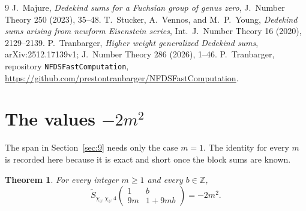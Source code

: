 \documentclass[11pt]{article}
\newtheorem{theorem}{Theorem}
\theoremstyle{remark}
\newcommand{\tS}{\widetilde{S}}
\newcommand{\Z}{\mathbb{Z}}
\begin{document}
\begin{thebibliography}{9}
J.~Majure, \emph{Dedekind sums for a Fuchsian group of genus zero}, J.~Number Theory 250 (2023), 35--48.
T.~Stucker, A.~Vennos, and M.~P.~Young, \emph{Dedekind sums arising from newform Eisenstein series}, Int.~J.~Number Theory 16 (2020), 2129--2139.
P.~Tranbarger, \emph{Higher weight generalized Dedekind sums}, arXiv:2512.17139v1; J.~Number Theory 286 (2026), 1--46.
P.~Tranbarger, repository \texttt{NFDSFastComputation}, \url{https://github.com/prestontranbarger/NFDSFastComputation}.
\end{thebibliography}

\appendix
\section{The values \(-2m^2\)}
\label{app:family}

The span in Section~\ref{sec:9} needs only the case \(m=1\).
The identity for every \(m\) is recorded here because it is exact and short once the block sums are known.

\begin{theorem}
\label{thm:family}
For every integer \(m\ge 1\) and every \(b\in\Z\),
\[
\tS_{\chi_3,\chi_3,4}\begin{pmatrix}1&b\\9m&1+9mb\end{pmatrix}=-2m^2.
\]
\end{theorem}
\end{document}
